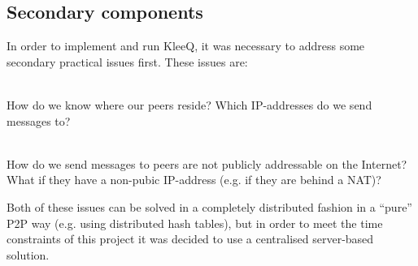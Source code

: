 \documentclass[a4paper, 12pt]{report}
\begin{document}
\subsection{Secondary components}
In order to implement and run KleeQ, it was necessary to address some secondary practical issues first. These issues are:
\begin{description}[labelindent=0.5cm, leftmargin=1.3cm, rightmargin=0.5cm]
    \item[Contact Discovery] \hfill \\
        How do we know where our peers reside? Which IP-addresses do we send messages to?
    \item[Transport] \hfill \\
        How do we send messages to peers are not publicly addressable on the Internet? What if they have a non-pubic IP-address (e.g. if they are behind a NAT)?
\end{description}

Both of these issues can be solved in a completely distributed fashion in a ``pure'' P2P way (e.g. using distributed hash tables), but in order to meet the time constraints of this project it was decided to use a centralised server-based solution. \\
\end{document}
